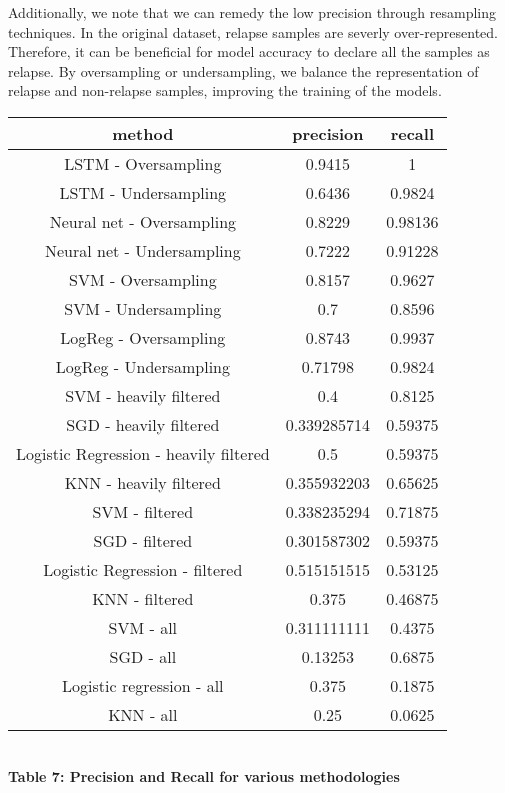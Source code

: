 \documentclass[12pt]{scrartcl}
\begin{document}
    Additionally, we note that we can remedy the low precision through resampling techniques. In the original dataset, relapse samples are severly over-represented. Therefore, it can be beneficial for model accuracy to declare all the samples as relapse. By oversampling or undersampling, we balance the representation of relapse and non-relapse samples, improving the training of the models.
    \begin{center}
    \begin{tabular}{|c|c|c|}
    \hline
    method & precision & recall\\
    \hline
    LSTM - Oversampling & 0.9415 & 1\\
    LSTM - Undersampling & 0.6436 & 0.9824\\
    Neural net - Oversampling & 0.8229 & 0.98136\\
    Neural net - Undersampling & 0.7222 & 0.91228\\
    SVM - Oversampling & 0.8157 & 0.9627\\
    SVM - Undersampling & 0.7 & 0.8596\\
    LogReg - Oversampling & 0.8743 & 0.9937\\
    LogReg - Undersampling & 0.71798& 0.9824\\
    SVM - heavily filtered & 0.4 & 0.8125\\
    SGD - heavily filtered & 0.339285714 & 0.59375\\
    Logistic Regression - heavily filtered & 0.5 & 0.59375\\
    KNN - heavily filtered & 0.355932203 & 0.65625\\
    SVM - filtered & 0.338235294 & 0.71875\\
    SGD - filtered & 0.301587302    & 0.59375\\
    Logistic Regression - filtered & 0.515151515 & 0.53125\\
    KNN - filtered & 0.375 & 0.46875\\
    SVM - all & 0.311111111 & 0.4375\\
    SGD - all & 0.13253 & 0.6875\\
    Logistic regression - all & 0.375 & 0.1875\\
    KNN - all & 0.25 & 0.0625\\
    
    \hline
    \end{tabular}\\
    \vspace{0.1in}
    \textbf{Table 7: Precision and Recall for various methodologies}  
    \end{center}
    
\end{document}
